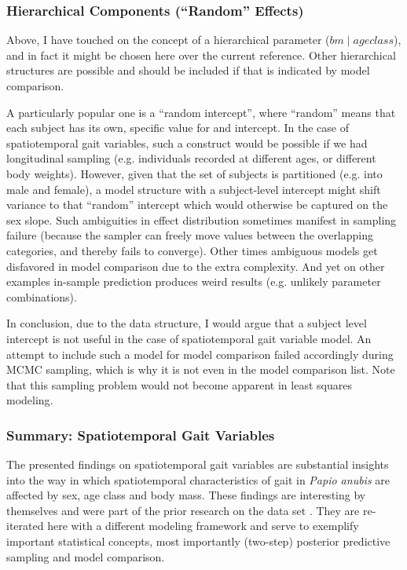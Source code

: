 \subsubsection{Hierarchical Components (``Random'' Effects)}
\label{sec:org86c8327}
Above, I have touched on the concept of a hierarchical parameter (\(bm\mid ageclass\)), and in fact it might be chosen here over the current reference.
Other hierarchical structures are possible and should be included if that is indicated by model comparison.

A particularly popular one is a ``random intercept'', where ``random'' means that each subject has its own, specific value for and intercept.
In the case of spatiotemporal gait variables, such a construct would be possible if we had longitudinal sampling (e.g. individuals recorded at different ages, or different body weights).
However, given that the set of subjects is partitioned (e.g. into male and female), a model structure with a subject-level intercept might shift variance to that ``random'' intercept which would otherwise be captured on the sex slope.
Such ambiguities in effect distribution sometimes manifest in sampling failure (because the sampler can freely move values between the overlapping categories, and thereby fails to converge).
Other times ambiguous models get disfavored in model comparison due to the extra complexity.
And yet on other examples in-sample prediction produces weird results (e.g. unlikely parameter combinations).

In conclusion, due to the data structure, I would argue that a subject level intercept is not useful in the case of spatiotemporal gait variable model.
An attempt to include such a model for model comparison failed accordingly during MCMC sampling, which is why it is not even in the model comparison list.
Note that this sampling problem would not become apparent in least squares modeling.


\subsubsection{Summary: Spatiotemporal Gait Variables}
\label{sec:org0d94e4f}
The presented findings on spatiotemporal gait variables are substantial insights into the way in which spatiotemporal characteristics of gait in \emph{Papio anubis} are affected by sex, age class and body mass.
These findings are interesting by themselves and were part of the prior research on the data set \citep[][]{Druelle2021}.
They are re-iterated here with a different modeling framework and serve to exemplify important statistical concepts, most importantly (two-step) posterior predictive sampling and model comparison.

